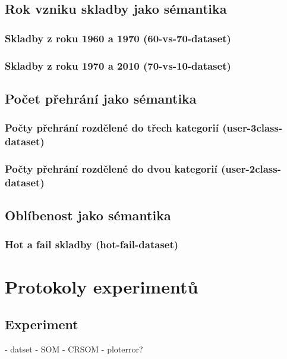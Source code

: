 \documentclass[thesis=M,czech]{FITthesis}[2012/06/26]
\begin{document}
\section{Rok vzniku skladby jako sémantika}

\subsection{Skladby z roku 1960 a 1970 (60-vs-70-dataset)}\label{sec:60-vs-70-dataset}

\subsection{Skladby z roku 1970 a 2010 (70-vs-10-dataset)}\label{sec:70-vs-10-dataset}

\section{Počet přehrání jako sémantika}

\subsection{Počty přehrání rozdělené do třech kategorií (user-3class-dataset)}\label{sec:user-3class-dataset}
\subsection{Počty přehrání rozdělené do dvou kategorií (user-2class-dataset)}\label{sec:user-2class-dataset}

\section{Oblíbenost jako sémantika}

\subsection{Hot a fail skladby (hot-fail-dataset)}\label{sec:hot-fail-dataset}

\chapter{Protokoly experimentů}
\section{Experiment}

- datset
- SOM
- CRSOM
- ploterror?
\end{document}
